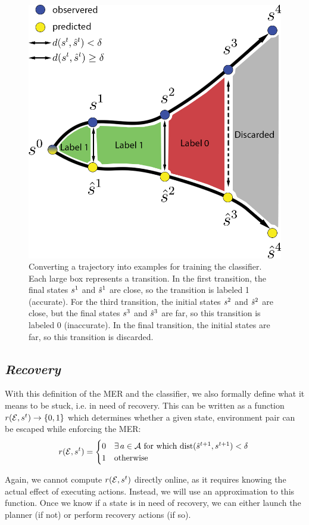 \begin{figure}
    \centering
    \includegraphics[width=0.5\linewidth]{Chap2/images/figure3-v2}
    \caption{Converting a trajectory into examples for training the classifier. Each large box represents a transition. In the first transition, the final states $s^1$ and $\hat{s}^1$ are close, so the transition is labeled 1 (accurate). For the third transition, the initial states $s^2$ and $\hat{s}^2$ are close, but the final states $s^3$ and $\hat{s}^3$ are far, so this transition is labeled 0 (inaccurate). In the final transition, the initial states are far, so this transition is discarded.}
    \label{Scirob:fig:figure3}
\end{figure}

\subsection{\textit{Recovery}}

With this definition of the MER and the classifier, we also formally define what it means to be stuck, i.e. in need of recovery. This can be written as a function $r(\mathcal{E},s^{t}) \rightarrow \{0,1\}$ which determines whether a given state, environment pair can be escaped while enforcing the MER: 
\begin{equation}
    r(\mathcal{E},s^{t})
    = \begin{cases}
    0 & \exists\,a \in \mathcal{A}\ \text{for which}\ \mathrm{dist}(\hat{s}^{t+1},s^{t+1}) < \delta \\
    1 & \text{otherwise}
    \end{cases} \\
    \label{Scirob:eq:recovery}
\end{equation}

Again, we cannot compute $r(\mathcal{E},s^{t})$ directly online, as it requires knowing the actual effect of executing actions. Instead, we will use an approximation to this function. Once we know if a state is in need of recovery, we can either launch the planner (if not) or perform recovery actions (if so).

